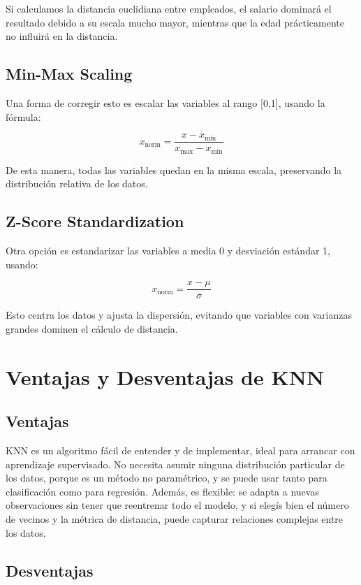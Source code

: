 \documentclass[12pt]{article}
\begin{document}
Si calculamos la distancia euclidiana entre empleados, el salario dominará el resultado debido a su escala mucho mayor, mientras que la edad prácticamente no influirá en la distancia.

\subsection{Min-Max Scaling}

Una forma de corregir esto es escalar las variables al rango [0,1], usando la fórmula:

\[
x_{\text{norm}} = \frac{x - x_{\min}}{x_{\max} - x_{\min}}
\]

De esta manera, todas las variables quedan en la misma escala, preservando la distribución relativa de los datos.

\subsection{Z-Score Standardization}

Otra opción es estandarizar las variables a media 0 y desviación estándar 1, usando:

\[
x_{\text{norm}} = \frac{x - \mu}{\sigma}
\]

Esto centra los datos y ajusta la dispersión, evitando que variables con varianzas grandes dominen el cálculo de distancia.

\section{Ventajas y Desventajas de KNN}

\subsection{Ventajas}

KNN es un algoritmo fácil de entender y de implementar, ideal para arrancar con aprendizaje supervisado. No necesita asumir ninguna distribución particular de los datos, porque es un método no paramétrico, y se puede usar tanto para clasificación como para regresión. Además, es flexible: se adapta a nuevas observaciones sin tener que reentrenar todo el modelo, y si elegís bien el número de vecinos y la métrica de distancia, puede capturar relaciones complejas entre los datos.

\subsection{Desventajas}
\end{document}
